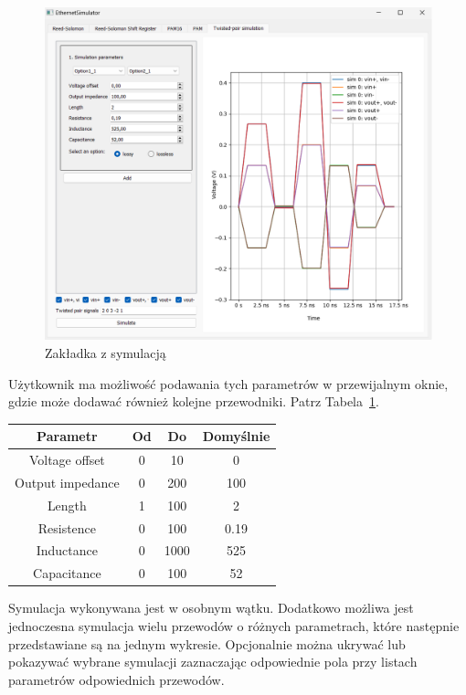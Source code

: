 \begin{figure}[H]
    \centering
    \includegraphics[width=\textwidth]{images/sim.png}
    \caption{Zakładka z symulacją}
    \label{fig:sim_png}
\end{figure}

Użytkownik ma możliwość podawania tych parametrów w przewijalnym oknie, gdzie może dodawać również kolejne przewodniki. Patrz Tabela~\ref{tab:parametry}.

\begin{table}[H]
    \centering
    \begin{tabular}{|c|c|c|c|}
        \hline
        \textbf{Parametr} & \textbf{Od} & \textbf{Do} & \textbf{Domyślnie} \\
        \hline
        Voltage offset & 0 & 10 & 0 \\
        Output impedance & 0 & 200 & 100 \\
        Length & 1 & 100 & 2 \\
        Resistence & 0 & 100 & 0.19 \\
        Inductance & 0 & 1000 & 525 \\
        Capacitance & 0 & 100 & 52 \\
        \hline
    \end{tabular}
    \label{tab:parametry}
\end{table}

Symulacja wykonywana jest w osobnym wątku. Dodatkowo możliwa jest jednoczesna symulacja wielu przewodów o różnych parametrach, które następnie przedstawiane są na jednym wykresie. Opcjonalnie można ukrywać lub pokazywać wybrane symulacji zaznaczając odpowiednie pola przy listach parametrów odpowiednich przewodów.
